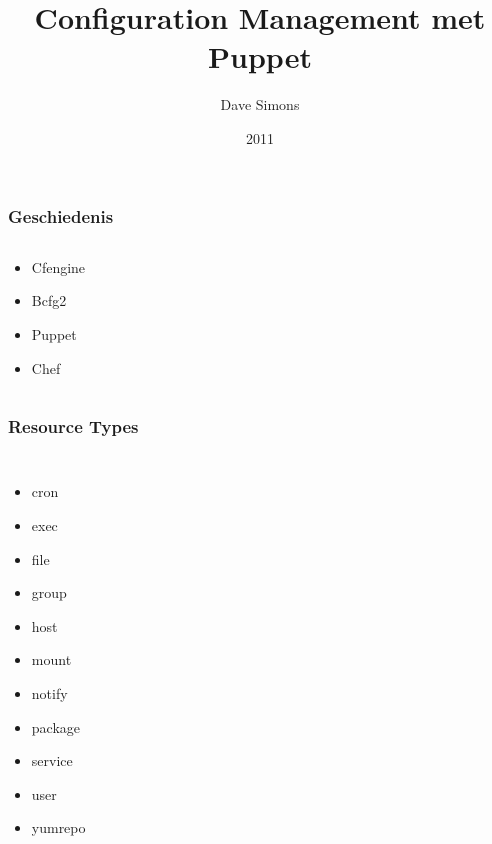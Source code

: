 \documentclass{beamer}
\begin{document}
\title{Configuration Management met Puppet}
\author[D. Simons]{Dave Simons}
\date{2011}
\maketitle


\begin{frame}
\frametitle{Geschiedenis}
\begin{columns}[c]
\begin{block}{}
\begin{itemize}
\item Cfengine
\item Bcfg2
\item Puppet
\item Chef
\end{itemize}
\end{block}
\end{columns}
\end{frame}


\begin{frame}
\frametitle{Resource Types}
\begin{columns}[c]
	\begin{itemize}
	\item cron
	\item exec
	\item file
	\item group
	\item host
	\item mount
	\item notify
	\item package
	\item service
	\item user
	\item yumrepo
	\end{itemize}
\end{columns}
\end{frame}
\end{document}
